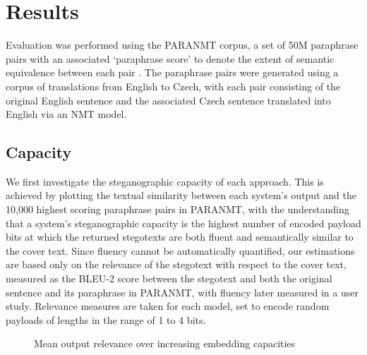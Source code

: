 \documentclass[12pt,a4paper]{article}
\begin{document}
\vspace{2mm}
\section{Results}

\noindent Evaluation was performed using the P{\footnotesize ARA}NMT corpus, a set of 50M paraphrase pairs with an associated `paraphrase score' to denote the extent of semantic equivalence between each pair \cite{paranmt}. The paraphrase pairs were generated using a corpus of translations from English to Czech, with each pair consisting of the original English sentence and the associated Czech sentence translated into English via an NMT model.

\subsection{Capacity}

\noindent We first investigate the steganographic capacity of each approach. This is achieved by plotting the textual similarity between each system's output and the 10,000 highest scoring paraphrase pairs in P{\footnotesize ARA}NMT, with the understanding that a system's steganographic capacity is the highest number of encoded payload bits at which the returned stegotexts are both fluent and semantically similar to the cover text. Since fluency cannot be automatically quantified, our estimations are based only on the relevance of the stegotext with respect to the cover text, measured as the BLEU-2 score between the stegotext and both the original sentence and its paraphrase in P{\footnotesize ARA}NMT, with fluency later measured in a user study. Relevance measures are taken for each model, set to encode random payloads of lengths in the range of 1 to 4 bits. 


\begin{figure}[htp]
  \centering
  
  \caption{Mean output relevance over increasing embedding capacities}
  \label{capacity}
\end{figure}
\end{document}
